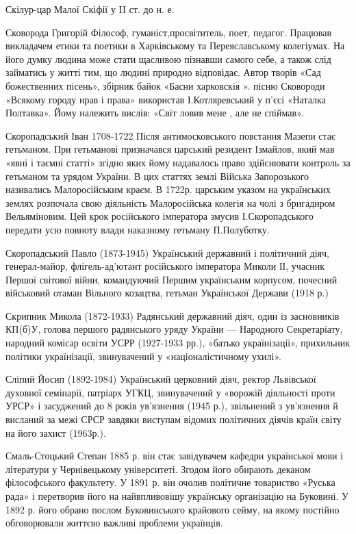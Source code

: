 Скілур-цар Малої Скіфії у II ст. до н. е.

Сковорода Григорій Філософ, гуманіст,просвітитель, поет, педагог. Працював викладачем етики та поетики в Харківському та Переяславському колегіумах. На його думку людина може стати щасливою пізнавши самого себе, а також слід займатись у житті тим, що людині природно відповідає. Автор творів «Сад божественних пісень», збірник байок «Басни харковскія ». пісню Сковороди «Всякому городу нрав і права» використав І.Котляревський у п’єсі «Наталка Полтавка». Йому належить вислів: «Світ ловив мене , але не спіймав».

Скоропадський  Іван 1708-1722 Після антимосковського повстання Мазепи стає гетьманом. При гетьманові призначався царський резидент Ізмайлов, який мав «явні і таємні статті» згідно яких йому надавалось право здійснювати контроль за гетьманом та урядом України. В цих статтях землі Війська Запорозького називались Малоросійським краєм. В 1722р. царським указом на українських землях розпочала свою діяльність Малоросійська колегія на чолі з бригадиром Вельяміновим. Цей крок російського імператора змусив І.Скоропадського передати усю повноту влади наказному гетьману П.Полуботку.

Скоропадський Павло (1873-1945) Український державний і політичний діяч, генерал-майор, флігель-ад’ютант російського імператора Миколи ІІ, учасник Першої світової війни, командуючий Першим українським корпусом, почесний військовий отаман Вільного козацтва, гетьман Української Держави (1918 р.)

Скрипник Микола (1872-1933) Радянський державний діяч, один із засновників КП(б)У, голова першого радянського уряду України --- Народного Секретаріату, народний комісар освіти УСРР (1927-1933 рр.), «батько українізації», прихильник політики українізації, звинувачений у «націоналістичному ухилі».

Сліпий Йосип (1892-1984) Український церковний діяч, ректор Львівської духовної семінарії, патріарх УГКЦ, звинувачений у «ворожій діяльності проти УРСР» і засуджений до 8 років ув’язнення (1945 р.), звільнений з ув’язнення й висланий за межі СРСР завдяки виступам відомих політичних діячів країн світу на його захист (1963р.). 

Смаль-Стоцький Степан 1885 р. він стає завідувачем кафедри української мови і літератури у Чернівецькому університеті. Згодом його обирають деканом філософського факультету. У 1891 р. він очолив політичне товариство «Руська рада» і перетворив його на найвпливовішу українську організацію на Буковині. У 1892 р. його обрано послом Буковинського крайового сейму, на якому постійно обговорювали життєво важливі проблеми українців. 

